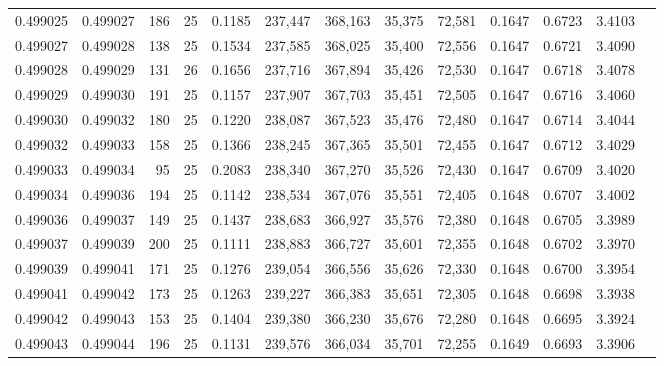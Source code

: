\begin{tabular}{rrrrrrrrrrrrr}
0.499025 & 0.499027 & 186 &  25 &                                     0.1185 & 237,447 & 368,163 &  35,375 &  72,581 & 0.1647 & 0.6723 & 3.4103 \\
0.499027 & 0.499028 & 138 &  25 &                                     0.1534 & 237,585 & 368,025 &  35,400 &  72,556 & 0.1647 & 0.6721 & 3.4090 \\
0.499028 & 0.499029 & 131 &  26 &                                     0.1656 & 237,716 & 367,894 &  35,426 &  72,530 & 0.1647 & 0.6718 & 3.4078 \\
0.499029 & 0.499030 & 191 &  25 &                                     0.1157 & 237,907 & 367,703 &  35,451 &  72,505 & 0.1647 & 0.6716 & 3.4060 \\
0.499030 & 0.499032 & 180 &  25 &                                     0.1220 & 238,087 & 367,523 &  35,476 &  72,480 & 0.1647 & 0.6714 & 3.4044 \\
0.499032 & 0.499033 & 158 &  25 &                                     0.1366 & 238,245 & 367,365 &  35,501 &  72,455 & 0.1647 & 0.6712 & 3.4029 \\
0.499033 & 0.499034 &  95 &  25 &                                     0.2083 & 238,340 & 367,270 &  35,526 &  72,430 & 0.1647 & 0.6709 & 3.4020 \\
0.499034 & 0.499036 & 194 &  25 &                                     0.1142 & 238,534 & 367,076 &  35,551 &  72,405 & 0.1648 & 0.6707 & 3.4002 \\
0.499036 & 0.499037 & 149 &  25 &                                     0.1437 & 238,683 & 366,927 &  35,576 &  72,380 & 0.1648 & 0.6705 & 3.3989 \\
0.499037 & 0.499039 & 200 &  25 &                                     0.1111 & 238,883 & 366,727 &  35,601 &  72,355 & 0.1648 & 0.6702 & 3.3970 \\
0.499039 & 0.499041 & 171 &  25 &                                     0.1276 & 239,054 & 366,556 &  35,626 &  72,330 & 0.1648 & 0.6700 & 3.3954 \\
0.499041 & 0.499042 & 173 &  25 &                                     0.1263 & 239,227 & 366,383 &  35,651 &  72,305 & 0.1648 & 0.6698 & 3.3938 \\
0.499042 & 0.499043 & 153 &  25 &                                     0.1404 & 239,380 & 366,230 &  35,676 &  72,280 & 0.1648 & 0.6695 & 3.3924 \\
0.499043 & 0.499044 & 196 &  25 &                                     0.1131 & 239,576 & 366,034 &  35,701 &  72,255 & 0.1649 & 0.6693 & 3.3906 \\

\end{tabular}
